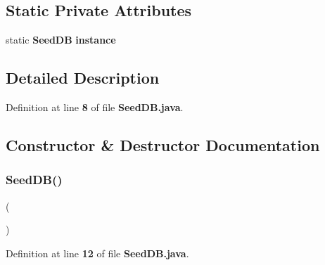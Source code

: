 \subsection*{Static Private Attributes}
\begin{DoxyCompactItemize}
\item 
static {\bf Seed\+DB} {\bf instance}
\end{DoxyCompactItemize}


\subsection{Detailed Description}


Definition at line {\bf 8} of file {\bf Seed\+D\+B.\+java}.



\subsection{Constructor \& Destructor Documentation}
\label{classch_1_1bfh_1_1gr33nopo55um_1_1enocean_1_1persistence_1_1SeedDB_a60b74c6d59d0b33a91d759bd30b68c26} 
\subsubsection{Seed\+D\+B()}
{\footnotesize{} (\begin{DoxyParamCaption}{ }\end{DoxyParamCaption})\hspace{0.3cm}{\ttfamily [private]}}



Definition at line {\bf 12} of file {\bf Seed\+D\+B.\+java}.

